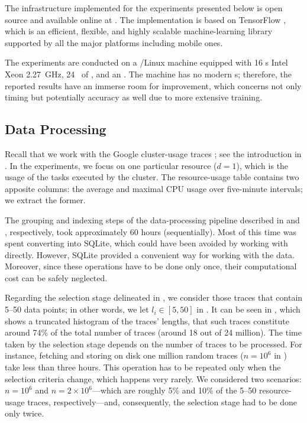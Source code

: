 The infrastructure implemented for the experiments presented below is open
source and available online at \cite{sources}. The implementation is based on
TensorFlow \cite{abadi2015}, which is an efficient, flexible, and highly
scalable machine-learning library supported by all the major platforms including
mobile ones.

The experiments are conducted on a /Linux machine equipped with 16
s Intel Xeon  2.27~GHz, 24~ of , and an
. The machine has no modern s; therefore, the reported results
have an immerse room for improvement, which concerns not only timing but
potentially accuracy as well due to more extensive training.

\subsection{Data Processing}
Recall that we work with the Google cluster-usage traces \cite{reiss2011}; see
the introduction in . In the experiments, we focus on one particular
resource ($d = 1$), which is the  usage of the tasks executed by the
cluster. The resource-usage table contains two apposite columns: the average and
maximal CPU usage over five-minute intervals; we extract the former.

The grouping and indexing steps of the data-processing pipeline described in
 and , respectively, took approximately 60 hours
(sequentially). Most of this time was spent converting  into SQLite,
which could have been avoided by working with  directly. However, SQLite
provided a convenient way for working with the data. Moreover, since these
operations have to be done only once, their computational cost can be safely
neglected.


Regarding the selection stage delineated in , we consider those
traces that contain 5--50 data points; in other words, we let $l_i \in [5, 50]$
in . It can be seen in , which shows a truncated
histogram of the traces' lengths, that such traces constitute around 74\% of the
total number of traces (around 18 out of 24 million). The time taken by the
selection stage depends on the number of traces to be processed. For instance,
fetching and storing on disk one million random traces ($n = 10^6$ in
) take less than three hours. This operation has to be repeated
only when the selection criteria change, which happens very rarely. We
considered two scenarios: $n = 10^6$ and $n = 2 \times 10^6$---which are roughly
5\% and 10\% of the 5--50 resource-usage traces, respectively---and,
consequently, the selection stage had to be done only twice.
